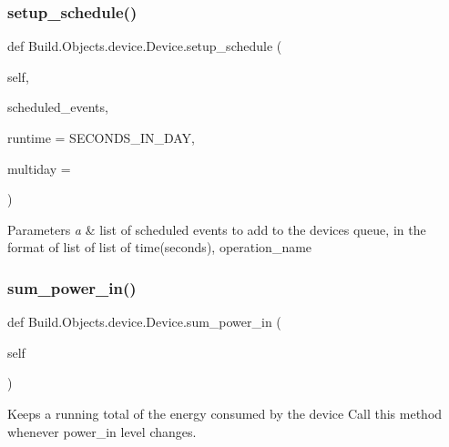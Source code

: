 \subsubsection{\texorpdfstring{setup\+\_\+schedule()}{setup\_schedule()}}
{\footnotesize\ttfamily def Build.\+Objects.\+device.\+Device.\+setup\+\_\+schedule (\begin{DoxyParamCaption}\item[{}]{self,  }\item[{}]{scheduled\+\_\+events,  }\item[{}]{runtime = {\ttfamily SECONDS\+\_\+IN\+\_\+DAY},  }\item[{}]{multiday = {} }\end{DoxyParamCaption})}


\begin{DoxyParams}{Parameters}
{\em a} & list of scheduled events to add to the device\textquotesingle{}s queue, in the format of list of list of time(seconds), operation\+\_\+name \\
\hline
\end{DoxyParams}
\mbox{\label{class_build_1_1_objects_1_1device_1_1_device_a6a7287bc43dacb4ab23d04dbd8c01d2f}} 
\subsubsection{\texorpdfstring{sum\+\_\+power\+\_\+in()}{sum\_power\_in()}}
{\footnotesize\ttfamily def Build.\+Objects.\+device.\+Device.\+sum\+\_\+power\+\_\+in (\begin{DoxyParamCaption}\item[{}]{self }\end{DoxyParamCaption})}



Keeps a running total of the energy consumed by the device Call this method whenever power\+\_\+in level changes. 

\mbox{\label{class_build_1_1_objects_1_1device_1_1_device_acbaf978b589fe80b8d4da2f25b266b32}} 

